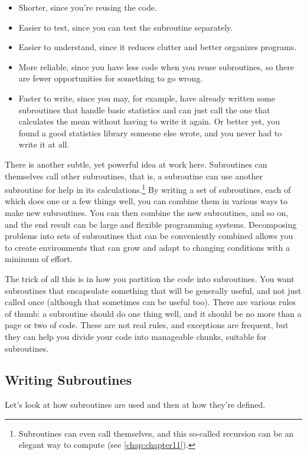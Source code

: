 \begin{itemize}
  \item Shorter, since you're reusing the code.
  \item Easier to test, since you can test the subroutine separately.
  \item Easier to understand, since it reduces clutter and better organizes programs.
  \item More reliable, since you have less code when you reuse subroutines, so there are fewer opportunities for something to go wrong.
  \item Faster to write, since you may, for example, have already written some subroutines that handle basic statistics and can just call the one that calculates the mean without having to write it again. Or better yet, you found a good statistics library someone else wrote, and you never had to write it at all.
\end{itemize}

There is another subtle, yet powerful idea at work here. Subroutines can themselves call other subroutines, that is, a subroutine can use another subroutine for help in its calculations.\footnote{Subroutines can even call themselves, and this so-called recursion can be an elegant way to compute (see \autoref{chap:chapter11}).} By writing a set of subroutines, each of which does one or a few things well, you can combine them in various ways to make new subroutines. You can then combine the new subroutines, and so on, and the end result can be large and flexible programming systems. Decomposing problems into sets of subroutines that can be conveniently combined allows you to create environments that can grow and adapt to changing conditions with a minimum of effort.

The trick of all this is in how you partition the code into subroutines. You want subroutines that encapsulate something that will be generally useful, and not just called once (although that sometimes can be useful too). There are various rules of thumb: a subroutine should do one thing well, and it should be no more than a page or two of code. These are not real rules, and exceptions are frequent, but they can help you divide your code into manageable chunks, suitable for subroutines. 

\subsection{Writing Subroutines}
Let's look at how subroutines are used and then at how they're defined.


